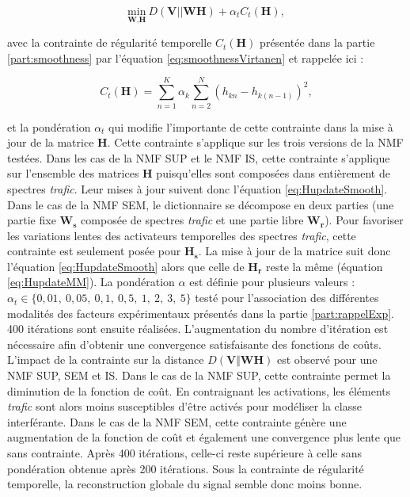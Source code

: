 \begin{equation}
\underset{\textbf{W},\textbf{H}}{\text{min}}~D\left(\textbf{V} \vert\vert \textbf{WH}\right) + \alpha_t C_t(\mathbf{H}),
\end{equation}


avec la contrainte de régularité temporelle $C_t(\mathbf{H})$ présentée dans la partie \ref{part:smoothness} par l'équation \ref{eq:smoothnessVirtanen} et rappelée ici : 

\begin{equation}
C_t(\mathbf{H}) = \sum_{n=1}^K \alpha_k\sum_{n=2}^N \left(h_{kn} - h_{k(n-1)}\right)^2,
\end{equation}

et la pondération $\alpha_t$ qui modifie l'importante de cette contrainte dans la mise à jour de la matrice $\mathbf{H}$.
Cette contrainte s'applique sur les trois versions de la  NMF testées. Dans les cas de la NMF SUP et le NMF IS, cette contrainte s'applique sur l'ensemble des matrices $\mathbf{H}$ puisqu'elles sont composées dans entièrement de spectres \textit{trafic}. Leur mises à jour suivent donc l'équation \ref{eq:HupdateSmooth}. Dans le cas de la NMF SEM, le dictionnaire se décompose en deux parties (une partie fixe $\mathbf{W_s}$ composée de spectres \textit{trafic} et une partie libre $\mathbf{W_r}$). Pour favoriser les variations lentes des activateurs temporelles des spectres \textit{trafic}, cette contrainte est seulement posée pour $\mathbf{H_s}$. La mise à jour de la matrice suit donc l'équation \ref{eq:HupdateSmooth} alors que celle de $\mathbf{H_r}$ reste la même (équation \ref{eq:HupdateMM}).
La pondération $\alpha$ est définie pour plusieurs valeurs : $\alpha_t \in \lbrace 0,01,~ 0,05,~ 0,1,~ 0,5,~ 1,~2,~3,~5 \rbrace$ testé pour l'association des différentes modalités des facteurs expérimentaux présentés dans la partie \ref{part:rappelExp}. 400 itérations sont ensuite réalisées.
L'augmentation du nombre d'itération est nécessaire afin d'obtenir une convergence satisfaisante des fonctions de coûts. L'impact de la contrainte sur la distance $D(\mathbf{V}\Vert \mathbf{WH})$ est observé pour une NMF SUP, SEM et IS. 
Dans le cas de la NMF SUP, cette contrainte permet la diminution de la fonction de coût. En contraignant les activations, les éléments \textit{trafic} sont alors moins susceptibles d'être activés pour modéliser la classe interférante. Dans le cas de la NMF SEM, cette contrainte génère une augmentation de la fonction de coût et également une convergence plus lente que sans contrainte. Après 400 itérations, celle-ci reste supérieure à celle sans pondération obtenue après 200 itérations. Sous la contrainte de régularité temporelle, la reconstruction globale du signal semble donc moins bonne.
 
